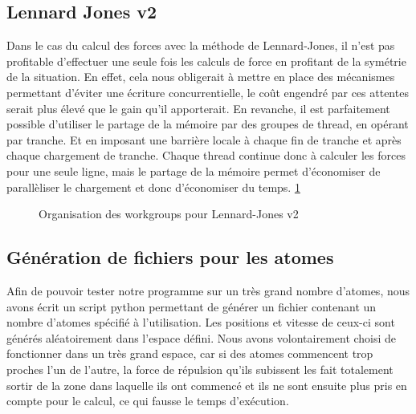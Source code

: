 \documentclass{article}
\begin{document}
\subsection{Lennard Jones v2}
Dans le cas du calcul des forces avec la méthode de Lennard-Jones, il n'est pas
profitable d'effectuer une seule fois les calculs de force en profitant de la
symétrie de la situation. En effet, cela nous obligerait à mettre en place des
mécanismes permettant d'éviter une écriture concurrentielle, le coût engendré
par ces attentes serait plus élevé que le gain qu'il apporterait.
En revanche, il est parfaitement possible d'utiliser le partage de la mémoire
par des groupes de thread, en opérant par tranche. Et en imposant une barrière
locale à chaque fin de tranche et après chaque chargement de tranche.
Chaque thread continue donc à calculer les forces pour une seule ligne, mais le
partage de la mémoire permet d'économiser de parallèliser le chargement et donc
d'économiser du temps. \ref{lennard-jones-v2}
\begin{figure}
  \caption{Organisation des workgroups pour Lennard-Jones v2}
  \label{lennard-jones-v2}
\end{figure}


\subsection{Génération de fichiers pour les atomes}
Afin de pouvoir tester notre programme sur un très grand nombre d'atomes, nous
avons écrit un script python permettant de générer un fichier contenant un
nombre d'atomes spécifié à l'utilisation. Les positions et vitesse de ceux-ci
sont générés aléatoirement dans l'espace défini. Nous avons volontairement
choisi de fonctionner dans un très grand espace, car si des atomes commencent
trop proches l'un de l'autre, la force de répulsion qu'ils subissent les fait
totalement sortir de la zone dans laquelle ils ont commencé et ils ne sont
ensuite plus pris en compte pour le calcul, ce qui fausse le temps d'exécution.
\end{document}
